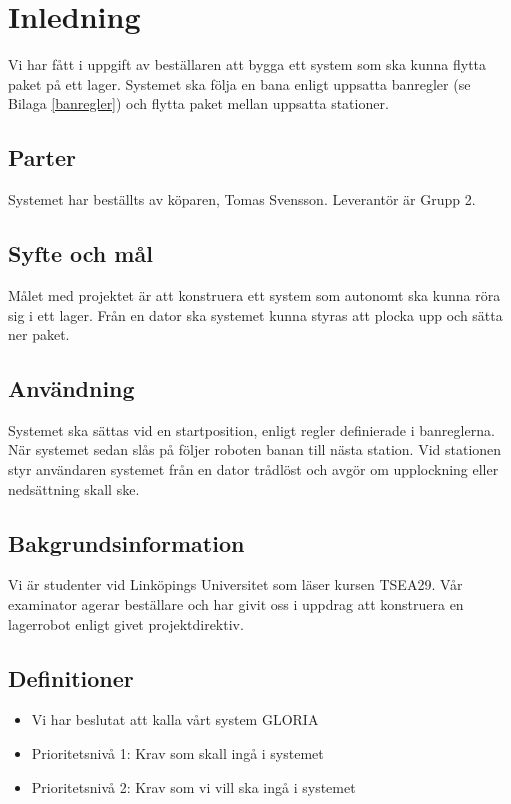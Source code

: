 \section{Inledning}
Vi har fått i uppgift av beställaren att bygga ett system som ska kunna flytta paket på ett lager. Systemet ska följa en bana enligt uppsatta banregler (se Bilaga \ref{banregler}) och flytta paket mellan uppsatta stationer.

\begin{LIPSkravlista}
\end{LIPSkravlista}

\subsection{Parter}
Systemet har beställts av köparen, Tomas Svensson. Leverantör är Grupp 2.

\subsection{Syfte och mål}
Målet med projektet är att konstruera ett system som autonomt ska kunna röra sig i ett lager. Från en dator ska systemet kunna styras att plocka upp och sätta ner paket.

\subsection{Användning}
Systemet ska sättas vid en startposition, enligt regler definierade i banreglerna. När systemet sedan slås på följer roboten banan till nästa station. Vid stationen styr användaren systemet från en dator trådlöst och avgör om upplockning eller nedsättning skall ske.

\subsection{Bakgrundsinformation}
Vi är studenter vid Linköpings Universitet som läser kursen TSEA29. Vår examinator agerar beställare och har givit oss i uppdrag att konstruera en lagerrobot enligt givet projektdirektiv.

\subsection{Definitioner}

\begin{itemize}
\item{Vi har beslutat att kalla vårt system GLORIA}
\item{Prioritetsnivå 1: Krav som skall ingå i systemet}
\item{Prioritetsnivå 2: Krav som vi vill ska ingå i systemet}
\end{itemize}
